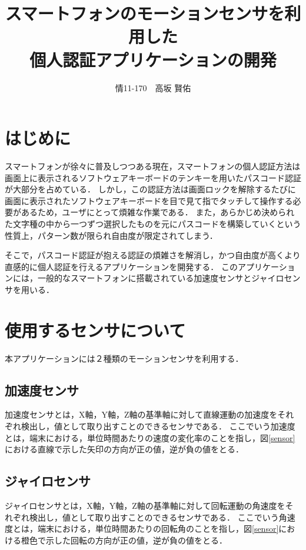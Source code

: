 \documentclass[11pt]{jreport}
\title{\bfseries スマートフォンのモーションセンサを利用した\\個人認証アプリケーションの開発}
\author{情11-170　高坂 賢佑}
\date{}
\begin{document}
\maketitle

\tableofcontents
\listoffigures

\chapter*{はじめに}
スマートフォンが徐々に普及しつつある現在，スマートフォンの個人認証方法は画面上に表示されるソフトウェアキーボードのテンキーを用いたパスコード認証が大部分を占めている．
しかし，この認証方法は画面ロックを解除するたびに画面に表示されたソフトウェアキーボードを目で見て指でタッチして操作する必要があるため，ユーザにとって煩雑な作業である．
また，あらかじめ決められた文字種の中から一つずつ選択したものを元にパスコードを構築していくという性質上，パターン数が限られ自由度が限定されてしまう．

そこで，パスコード認証が抱える認証の煩雑さを解消し，かつ自由度が高くより直感的に個人認証を行えるアプリケーションを開発する．
このアプリケーションには，一般的なスマートフォンに搭載されている加速度センサとジャイロセンサを用いる．

\chapter{使用するセンサについて}
本アプリケーションには２種類のモーションセンサを利用する．

	\section{加速度センサ}
	加速度センサとは，X軸，Y軸，Z軸の基準軸に対して直線運動の加速度をそれぞれ検出し，値として取り出すことのできるセンサである．
	ここでいう加速度とは，端末における，単位時間あたりの速度の変化率のことを指し，図\ref{sensor}における直線で示した矢印の方向が正の値，逆が負の値をとる．
	
	\section{ジャイロセンサ}
	ジャイロセンサとは，X軸，Y軸，Z軸の基準軸に対して回転運動の角速度をそれぞれ検出し，値として取り出すことのできるセンサである．
    ここでいう角速度とは，端末における，単位時間あたりの回転角のことを指し，図\ref{sensor}における橙色で示した回転の方向が正の値，逆が負の値をとる．
\end{document}
